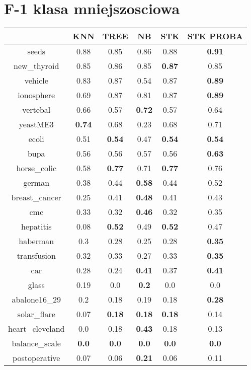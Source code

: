\documentclass{article}%
\begin{document}
\section*{F{-}1 klasa mniejszosciowa}%
\begin{tabular}{c|ccccc}%
&KNN&TREE&NB&STK&STK PROBA\\%
\hline%
seeds&0.88&0.85&0.86&0.88&\textbf{0.91}\\%
new\_thyroid&0.85&0.86&0.85&\textbf{0.87}&0.85\\%
vehicle&0.83&0.87&0.54&0.87&\textbf{0.89}\\%
ionosphere&0.69&0.87&0.81&0.87&\textbf{0.89}\\%
vertebal&0.66&0.57&\textbf{0.72}&0.57&0.64\\%
yeastME3&\textbf{0.74}&0.68&0.23&0.68&0.71\\%
ecoli&0.51&\textbf{0.54}&0.47&\textbf{0.54}&\textbf{0.54}\\%
bupa&0.56&0.56&0.57&0.56&\textbf{0.63}\\%
horse\_colic&0.58&\textbf{0.77}&0.71&\textbf{0.77}&0.76\\%
german&0.38&0.44&\textbf{0.58}&0.44&0.52\\%
breast\_cancer&0.25&0.41&\textbf{0.48}&0.41&0.43\\%
cmc&0.33&0.32&\textbf{0.46}&0.32&0.35\\%
hepatitis&0.08&\textbf{0.52}&0.49&\textbf{0.52}&0.47\\%
haberman&0.3&0.28&0.25&0.28&\textbf{0.35}\\%
transfusion&0.32&0.33&0.27&0.33&\textbf{0.35}\\%
car&0.28&0.24&\textbf{0.41}&0.37&\textbf{0.41}\\%
glass&0.19&0.0&\textbf{0.2}&0.0&0.0\\%
abalone16\_29&0.2&0.18&0.19&0.18&\textbf{0.28}\\%
solar\_flare&0.07&\textbf{0.18}&\textbf{0.18}&\textbf{0.18}&0.14\\%
heart\_cleveland&0.0&0.18&\textbf{0.43}&0.18&0.13\\%
balance\_scale&\textbf{0.0}&\textbf{0.0}&\textbf{0.0}&\textbf{0.0}&\textbf{0.0}\\%
postoperative&0.07&0.06&\textbf{0.21}&0.06&0.11\\%
\end{tabular}

%
\end{document}
